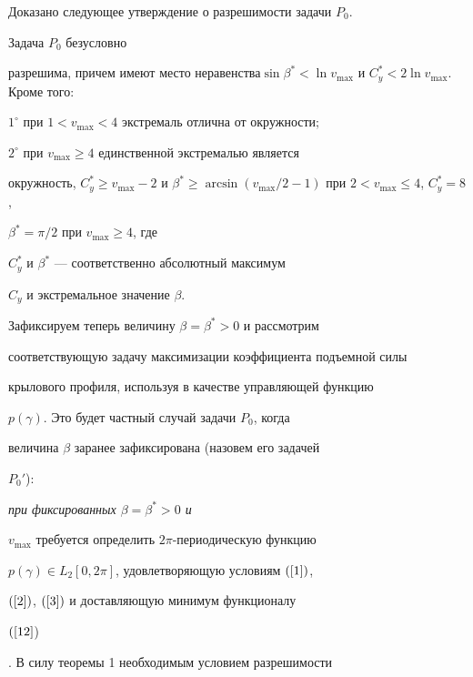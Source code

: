 \medskip





Доказано следующее утверждение о разрешимости задачи $P_{0}$.





\begin{thm}


Задача $P_{0}$ безусловно


разрешима, причем имеют место неравенства\linebreak $\sin \beta^{*} < \ln


v_{\max}$ и $C_{y}^{*}< 2\ln v_{\max}$. Кроме того\/${:}$





$1^{\circ}$ при $1 < v_{\max} < 4$ экстремаль отлична от окружности$;$





$2^{\circ}$ при $v_{\max}\geq 4$ единственной экстремалью является


окружность, $C_{y}^{*} \geq v_{\max}-2$ и $\beta^{*} \geq 


\arcsin (v_{\max}/2-1)$ при $2<v_{\max}\leq 4$, $C_{y}^{*} = 8$,


$\beta^{*} = \pi/2$ при $v_{\max} \geq 4$, где


$C_{y}^{*}$ и $\beta^{*}$ --- соответственно абсолютный максимум


$C_{y}$ и экстремальное значение $\beta$.


\end{thm}





Зафиксируем теперь величину $\beta=\beta^{*}>0$ и рассмотрим


соответствующую задачу максимизации коэффициента подъемной силы


крылового профиля, используя в качестве управляющей функцию


$p(\gamma)$. Это будет частный случай задачи $P_{0}$, когда


величина $\beta$ заранее зафиксирована (назовем его задачей


$P_{0}' $): {\it при фиксированных $\beta=\beta^{*}>0$ и


$v_{\max}$ требуется определить $2\pi$-периодическую функцию


$p(\gamma) \in L_2 [0, 2\pi]$, удовлетворяющую условиям $(\ref{1})$,


$(\ref{2})$, $(\ref{3})$ и доставляющую минимум функционалу


$(\ref{12}$)}. В силу теоремы 1 необходимым условием разрешимости


